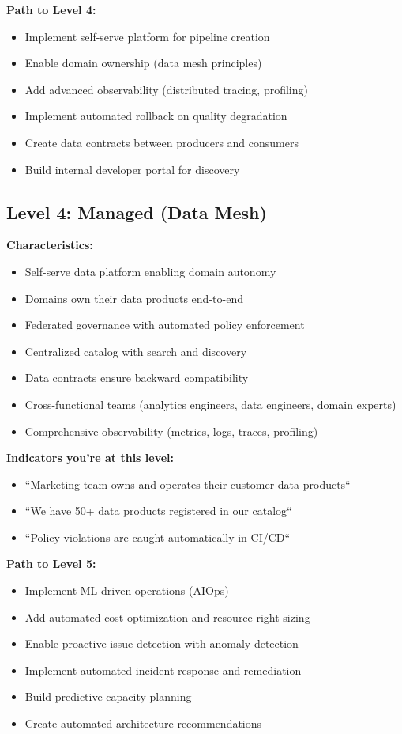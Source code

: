 \textbf{Path to Level 4:}
\begin{itemize}
    \item Implement self-serve platform for pipeline creation
    \item Enable domain ownership (data mesh principles)
    \item Add advanced observability (distributed tracing, profiling)
    \item Implement automated rollback on quality degradation
    \item Create data contracts between producers and consumers
    \item Build internal developer portal for discovery
\end{itemize}

\subsection{Level 4: Managed (Data Mesh)}

\textbf{Characteristics:}
\begin{itemize}
    \item Self-serve data platform enabling domain autonomy
    \item Domains own their data products end-to-end
    \item Federated governance with automated policy enforcement
    \item Centralized catalog with search and discovery
    \item Data contracts ensure backward compatibility
    \item Cross-functional teams (analytics engineers, data engineers, domain experts)
    \item Comprehensive observability (metrics, logs, traces, profiling)
\end{itemize}

\textbf{Indicators you're at this level:}
\begin{itemize}
    \item ``Marketing team owns and operates their customer data products``
    \item ``We have 50+ data products registered in our catalog``
    \item ``Policy violations are caught automatically in CI/CD``
\end{itemize}

\textbf{Path to Level 5:}
\begin{itemize}
    \item Implement ML-driven operations (AIOps)
    \item Add automated cost optimization and resource right-sizing
    \item Enable proactive issue detection with anomaly detection
    \item Implement automated incident response and remediation
    \item Build predictive capacity planning
    \item Create automated architecture recommendations
\end{itemize}

